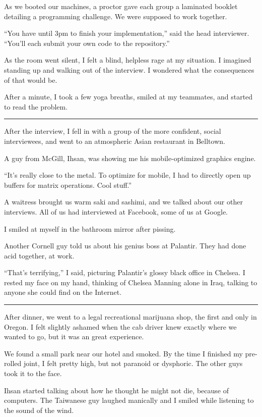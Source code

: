As we booted our machines, a proctor gave each group a laminated booklet
detailing a programming challenge.  We were supposed to work together.

``You have until 3pm to finish your implementation,'' said the head interviewer.
``You'll each submit your own code to the repository.''

As the room went silent, I felt a blind, helpless rage at my situation.  I
imagined standing up and walking out of the interview.  I wondered what the
consequences of that would be.  

After a minute, I took a few yoga breaths, smiled at my teammates, and started
to read the problem.

\plainfancybreak{12pt}{2}{* * *}

After the interview, I fell in with a group of the more confident, social
interviewees, and went to an atmospheric Asian restaurant in Belltown.

A guy from McGill, Ihsan, was showing me his mobile-optimized graphics engine.

``It's really close to the metal.  To optimize for mobile, I had to directly
open up buffers for matrix operations.  Cool stuff.''

A waitress brought us warm saki and sashimi, and we talked about our other
interviews.  All of us had interviewed at Facebook, some of us at Google.  

I smiled at myself in the bathroom mirror after pissing.

Another Cornell guy told us about his genius boss at Palantir.  They had done
acid together, at work.

``That's terrifying,'' I said, picturing Palantir's glossy black office in
Chelsea.  I rested my face on my hand, thinking of Chelsea Manning alone in
Iraq, talking to anyone she could find on the Internet.

\plainfancybreak{12pt}{2}{* * *}

After dinner, we went to a legal recreational marijuana shop, the first and only
in Oregon.  I felt slightly ashamed when the cab driver knew exactly where we
wanted to go, but it was an great experience.

We found a small park near our hotel and smoked.  By the time I finished my
pre-rolled joint, I felt pretty high, but not paranoid or dysphoric.  The other
guys took it to the face. 

Ihsan started talking about how he thought he might not die, because of
computers.  The Taiwanese guy laughed manically and I smiled while listening to
the sound of the wind. 

